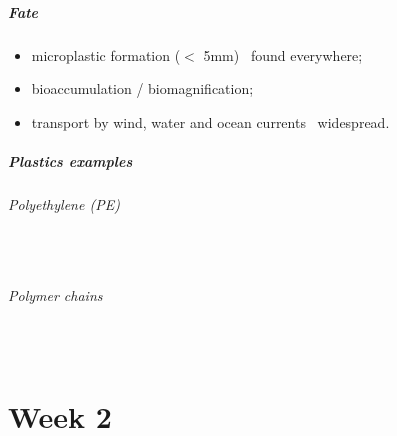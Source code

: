 \documentclass{article}
\newcommand{\pph}[1]{\paragraph{#1}\phantom{}\\}
\begin{document}
\subsubsection{Fate}
\begin{itemize}
    \item microplastic formation ($<$ 5mm) \textrightarrow\ found everywhere;
    \item bioaccumulation / biomagnification;
    \item transport by wind, water and ocean currents \textrightarrow\ widespread.
\end{itemize}

\subsubsection{Plastics examples}

\pph{Polyethylene (PE)}
\begin{center}
\end{center}

\pph{Polymer chains}
\begin{center}
\end{center}

\newpage
\part{Week 2}
\end{document}

